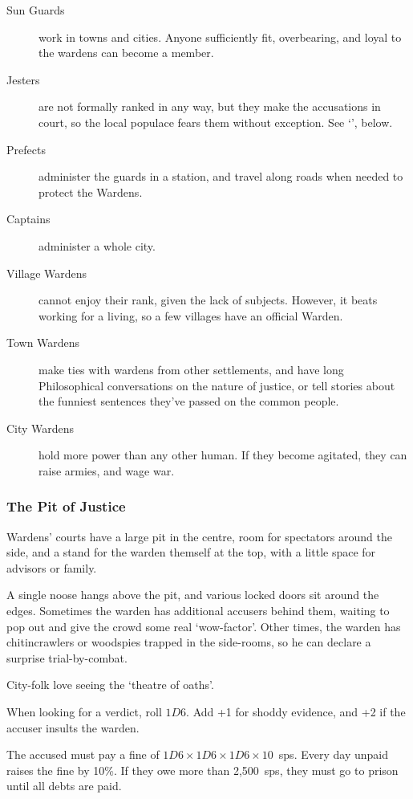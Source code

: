 \begin{multicols}{2}
\begin{description}
  \item[Sun Guards]
  work in towns and cities.
  Anyone sufficiently fit, overbearing, and loyal to the wardens can become a member.
  \item[Jesters]
  are not formally ranked in any way, but they make the accusations in court, so the local populace fears them without exception.
  See `', below.
  \item[Prefects]
  administer the guards in a station, and travel along roads when needed to protect the Wardens.
  \item[Captains]
  administer a whole city.
  \item[Village Wardens]
  cannot enjoy their rank, given the lack of subjects.
  However, it beats working for a living, so a few villages have an official Warden.
  \item[Town Wardens]
  make ties with wardens from other settlements, and have long Philosophical conversations on the nature of justice, or tell stories about the funniest sentences they've passed on the common people.
  \item[City Wardens]
  hold more power than any other human.
  If they become agitated, they can raise armies, and wage war.
\end{description}

\subsubsection{The Pit of Justice}

Wardens' courts have a large pit in the centre, room for spectators around the side, and a stand for the warden themself at the top, with a little space for advisors or family.

A single noose hangs above the pit, and various locked doors sit around the edges.
Sometimes the warden has additional accusers behind them, waiting to pop out and give the crowd some real `wow-factor'.
Other times, the warden has chitincrawlers or woodspies trapped in the side-rooms, so he can declare a surprise trial-by-combat.

City-folk love seeing the `theatre of oaths'.

When looking for a verdict, roll $1D6$.
Add +1 for shoddy evidence, and +2 if the accuser insults the warden.

\begin{dlist}
  \item
  The accused must pay a fine of $1D6\times 1D6\times 1D6\times 10$~\glspl{sp}.
  Every day unpaid raises the fine by 10\%.
  If they owe more than 2,500~\glspl{sp}, they must go to prison until all debts are paid.


\end{dlist}
\end{multicols}

